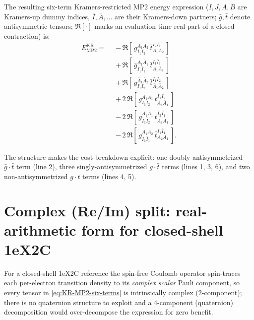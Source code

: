 \documentclass[11pt,oneside]{book}
\begin{document}
The resulting six-term Kramers-restricted MP2 energy expression
($I, J, A, B$ are Kramers-up dummy indices, $\bar{I}, \bar{A}, \dots$
are their Kramers-down partners; $\bar{g}, \bar{t}$ denote
antisymmetric tensors; $\Re[\cdot]$ marks an evaluation-time real-part
of a closed contraction) is:
\begin{align}
    E_{\text{MP2}}^{\text{KR}} =\;\;
    & -\,\Re\!\left[\, g^{A_1 A_2}_{I_1 I_2}\,
                       \bar{t}^{I_2 I_1}_{A_1 A_2}\, \right] \nonumber\\
    & +\,\Re\!\left[\, \bar{g}^{A_1 \bar{A}_1}_{I_1 \bar{I}_1}\,
                       \bar{t}^{I_1 \bar{I}_1}_{A_1 \bar{A}_1}\, \right] \nonumber\\
    & +\,\Re\!\left[\, g^{\bar{A}_1 \bar{A}_2}_{I_1 I_2}\,
                       \bar{t}^{I_1 I_2}_{\bar{A}_1 \bar{A}_2}\, \right] \nonumber\\
    & +\,2\,\Re\!\left[\, g^{A_1 \bar{A}_1}_{I_1 I_2}\,
                          t^{I_1 I_2}_{A_1 \bar{A}_1}\, \right] \nonumber\\
    & -\,2\,\Re\!\left[\, g^{A_1 \bar{A}_1}_{\bar{I}_1 \bar{I}_2}\,
                          t^{\bar{I}_2 \bar{I}_1}_{A_1 \bar{A}_1}\, \right] \nonumber\\
    & -\,2\,\Re\!\left[\, g^{A_1 A_2}_{I_1 \bar{I}_1}\,
                          \bar{t}^{I_1 \bar{I}_1}_{A_2 A_1}\, \right] .
    \label{eq:KR-MP2-six-terms}
\end{align}

The structure makes the cost breakdown explicit: one
doubly-antisymmetrized $\bar{g}\cdot\bar{t}$ term (line 2), three
singly-antisymmetrized $g\cdot\bar{t}$ terms (lines 1, 3, 6), and two
non-antisymmetrized $g\cdot t$ terms (lines 4, 5).

\section{Complex (Re/Im) split: real-arithmetic form for closed-shell
1eX2C}
\label{sec:KR-MP2-csplit}

For a closed-shell 1eX2C reference the spin-free Coulomb operator
spin-traces each per-electron transition density to its
\emph{complex scalar} Pauli component, so every tensor in
\cref{eq:KR-MP2-six-terms} is intrinsically complex (2-component);
there is no quaternion structure to exploit and a 4-component
(quaternion) decomposition would over-decompose the expression for
zero benefit.
\end{document}
